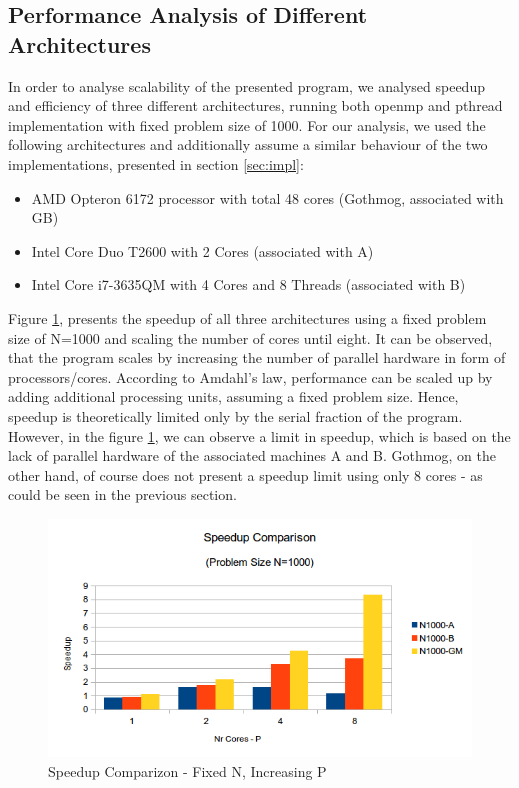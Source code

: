 \documentclass[conference]{IEEEtran}
\begin{document}
\subsection{Performance Analysis of Different Architectures}
\label{sec:analysis:openmp}

In order to analyse scalability of the presented program, we analysed speedup and efficiency of three different architectures, running both openmp and pthread implementation with fixed problem size of 1000. For our analysis, we used the following architectures and additionally assume a similar behaviour of the two implementations, presented in section \ref{sec:impl}:
\begin{itemize}
   \item AMD Opteron 6172 processor with total 48 cores (Gothmog, associated with GB)
   \item Intel Core Duo T2600 with 2 Cores (associated with A)
   \item Intel Core i7-3635QM with 4 Cores and 8 Threads (associated with B)
\end{itemize}


Figure \ref{pic:omp_speedup_comp}, presents the speedup of all three architectures using a fixed problem size of N=1000 and scaling the number of cores until eight. It can be observed, that the program scales by increasing the number of parallel hardware in form of processors/cores. According to Amdahl's law, performance can be scaled up by adding additional processing units, assuming a fixed problem size. Hence, speedup is theoretically limited only by the serial fraction of the program. However, in the figure \ref{pic:omp_speedup_comp}, we can observe a limit in speedup, which is based on the lack of parallel hardware of the associated machines A and B. Gothmog, on the other hand, of course does not present a speedup limit using only 8 cores - as could be seen in the previous section.

\begin{figure}[h]
  \centering
  \includegraphics[scale=0.55]{pic/omp_speedup_comp.png} 
  \caption{Speedup Comparizon - Fixed N, Increasing P}
  \label{pic:omp_speedup_comp}
\end{figure}
\end{document}
